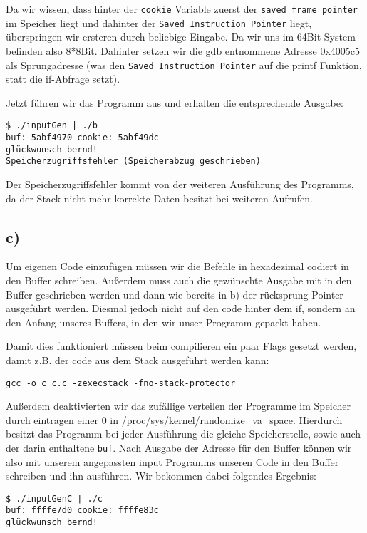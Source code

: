 \documentclass[10pt,a4paper]{article}
\begin{document}
Da wir wissen, dass hinter der \texttt{cookie} Variable zuerst der \texttt{saved frame pointer} im Speicher liegt und dahinter der \texttt{Saved Instruction Pointer} liegt, überspringen wir ersteren durch beliebige Eingabe. Da wir uns im 64Bit System befinden also 8*8Bit. Dahinter setzen wir die gdb entnommene Adresse 0x4005c5 als Sprungadresse (was den \texttt{Saved Instruction Pointer} auf die printf Funktion, statt die if-Abfrage setzt).

Jetzt führen wir das Programm aus und erhalten die entsprechende Ausgabe:
\begin{verbatim}
$ ./inputGen | ./b
buf: 5abf4970 cookie: 5abf49dc
glückwunsch bernd!
Speicherzugriffsfehler (Speicherabzug geschrieben)
\end{verbatim}

Der Speicherzugriffsfehler kommt von der weiteren Ausführung des Programms, da der Stack nicht mehr korrekte Daten besitzt bei weiteren Aufrufen.

\subsection*{c)}

Um eigenen Code einzufügen müssen wir die Befehle in hexadezimal codiert in den Buffer schreiben. Außerdem muss auch die gewünschte Ausgabe mit in den Buffer geschrieben werden und dann wie bereits in b) der rücksprung-Pointer ausgeführt werden. Diesmal jedoch nicht auf den code hinter dem if, sondern an den Anfang unseres Buffers, in den wir unser Programm gepackt haben.

Damit dies funktioniert müssen beim compilieren ein paar Flags gesetzt werden, damit z.B. der code aus dem Stack ausgeführt werden kann:
\begin{verbatim}
gcc -o c c.c -zexecstack -fno-stack-protector
\end{verbatim}

Außerdem deaktivierten wir das zufällige verteilen der Programme im Speicher durch eintragen einer 0 in /proc/sys/kernel/randomize\_va\_space. Hierdurch besitzt das Programm bei jeder Ausführung die gleiche Speicherstelle, sowie auch der darin enthaltene \texttt{buf}. Nach Ausgabe der Adresse für den Buffer können wir also mit unserem angepassten input Programms unseren Code in den Buffer schreiben und ihn ausführen. Wir bekommen dabei folgendes Ergebnis:
\begin{verbatim}
$ ./inputGenC | ./c
buf: ffffe7d0 cookie: ffffe83c
glückwunsch bernd!
\end{verbatim}
\end{document}
